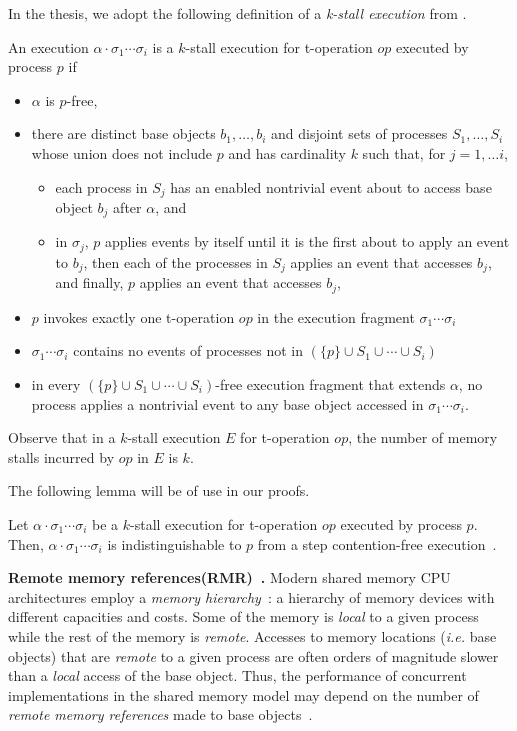 In the thesis, we adopt the following definition of a \emph{k-stall execution} from \cite{AGHK09,G05}.
\begin{definition}
\label{def:stalls}
An execution $\alpha\cdot \sigma_1 \cdots \sigma_i$ is a $k$-stall execution for t-operation $op$ executed by process $p$ if
\begin{itemize}
\item 
$\alpha$ is $p$-free,
\item
there are distinct base objects $b_1,\ldots , b_i$ and disjoint sets of processes $S_1,\ldots , S_i$
whose union does not include $p$
and has cardinality $k$ such that, for $j=1,\ldots i $,
\begin{itemize}
\item
each process in $S_j$ has an enabled nontrivial event about to access base object $b_j$ after $\alpha$, and
\item
in $\sigma_j$, $p$ applies events by itself until it is the first about to apply an event to $b_j$,
then each of the processes in $S_j$ applies an event that accesses $b_j$, and finally, $p$ applies an event that accesses $b_j$,
\end{itemize}
\item
$p$ invokes exactly one t-operation $op$ in the execution fragment $\sigma_1\cdots \sigma_i$
\item
$\sigma_1\cdots \sigma_i$ contains no events of processes not in $(\{p\}\cup S_1\cup \cdots \cup S_i)$
\item
in every $(\{p\}\cup S_1\cup \cdots \cup S_i)$-free execution fragment that extends $\alpha$, 
no process applies a nontrivial event to any base object accessed in $\sigma_1 \cdots \sigma_i$.
\end{itemize}
\end{definition}
Observe that in a $k$-stall execution $E$ for t-operation $op$, the number of memory stalls incurred by $op$
in $E$ is $k$.

The following lemma will be of use in our proofs.
\begin{lemma}
\label{lm:stalls}
Let $\alpha\cdot \sigma_1 \cdots \sigma_i$ be a $k$-stall execution for t-operation $op$ executed by process $p$.
Then, $\alpha\cdot \sigma_1 \cdots \sigma_i$ is indistinguishable to $p$ from a step contention-free execution~\cite{AGHK09}.
\end{lemma}
\vspace{1mm}\noindent\textbf{Remote memory references(RMR)~\cite{rmr-mutex}.}
Modern shared memory CPU architectures employ a \emph{memory hierarchy}~\cite{hennessy-patterson}:
a hierarchy of memory devices with different capacities and costs.
Some of the memory is \emph{local} to a given process while the rest of the memory is \emph{remote}.
Accesses to memory locations (\emph{i.e.} base objects) that are \emph{remote} to a given process
are often orders of magnitude slower than a \emph{local} access of the base object.
Thus, the performance of concurrent implementations in the shared memory model may depend on the number
of \emph{remote memory references} made to base objects~\cite{anderson-90-tpds}.

